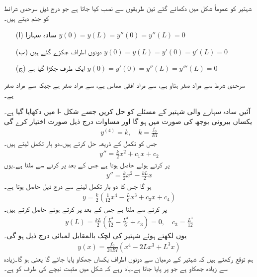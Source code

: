 شہتیر کو عموماً شکل  میں دکھائے گئے تین طریقوں سے  نصب کیا جاتا ہے جو درج ذیل سرحدی شرائط کو جنم دیتے ہیں۔
\begin{itemize}
\item[(ا)]\quad سادہ سہارا \quad
$y(0)=y(L)=y''(0)=y''(L)=0$
\item[(ب)]\quad دونوں اطراف جکڑے گئے ہیں \quad 
$y(0)=y(L)=y'(0)=y'(L)=0$
\item[(ج)]\quad ایک طرف جکڑا گیا ہے \quad
$y(0)=y'(0)=y''(L)=y'''(L)=0$
\end{itemize}
سرحدی  شرط  سے مراد صفر ہٹاو ہے،  سے مراد افقی مماس ہے،  سے مراد صفر   ہے جبکہ  سے مراد صفر  ہے۔

آئیں سادہ سہارے والی شہتیر کے مسئلے کو حل کریں جسے شکل -ا میں دکھایا گیا ہے۔یکساں بیرونی بوجھ کی صورت میں  ہو گا اور مساوات  درج ذیل صورت اختیار کرے گی
\begin{align}
y^{(4)}=k, \quad k=\frac{f_0}{EI}
\end{align}
جس کو تکمل کے ذریعہ حل کرتے ہیں۔دو بار تکمل لیتے ہیں۔
\begin{align*}
y''=\frac{k}{2}x^2+c_1x+c_2
\end{align*}
 پر کرتے ہوئے  حاصل ہوتا ہے جس کے بعد   پر کرنے سے  ملتا ہے۔یوں
\begin{align*}
y''=\frac{k}{2}x^2-\frac{kL}{2}x
\end{align*}
ہو گا جس کا دو بار تکمل لینے سے درج ذیل حاصل ہوتا ہے۔
\begin{align*}
y=\frac{k}{2}\left(\frac{1}{12}x^4-\frac{L}{6}x^3+c_3x+c_4\right)
\end{align*}
 پر کرنے سے  ملتا ہے جس کے بعد  پر کرتے ہوئے  حاصل کرتے ہیں۔
\begin{align*}
y(L)=\frac{kL}{2}\left(\frac{L^3}{12}-\frac{L^3}{6}+c_3\right)=0, \quad c_3=\frac{L^3}{12}
\end{align*}
یوں  لکھتے ہوئے شہتیر کی لچک بالمقابل لمبائی درج ذیل ہو گی۔
\begin{align*}
y(x)=\frac{f_0}{24EI}(x^4-2Lx^3+L^3x)
\end{align*}
ہم توقع رکھتے ہیں کہ شہتیر کے درمیان سے دونوں اطراف یکساں جھکاو پایا جائے گا یعنی  ہو گا۔زیادہ سے زیادہ جھکاو  ہے جو  پر پایا جاتا ہے۔یاد رہے کہ شکل  میں مثبت  نیچے کی طرف کو ہے۔

